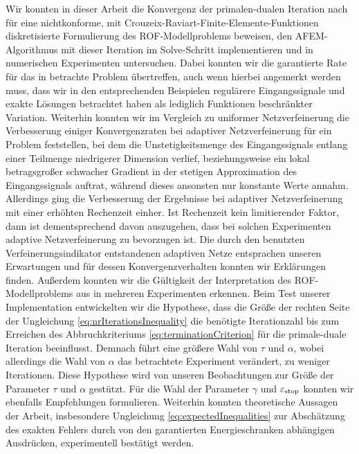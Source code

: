 Wir konnten in dieser Arbeit die Konvergenz der primalen-dualen Iteration nach
\cite{Bar15} für eine nichtkonforme, mit
Crouzeix-Raviart-Finite-Elemente-Funktionen diskretisierte Formulierung des
ROF-Modellproblems beweisen, den AFEM-Algorithmus mit dieser Iteration im
Solve-Schritt implementieren und in numerischen Experimenten
untersuchen. 
Dabei konnten wir die garantierte Rate für das in \cite{Bar15} betrachte
Problem übertreffen, auch wenn hierbei angemerkt werden muss, dass
wir in den entsprechenden Beispielen regulärere Eingangssignale und exakte
Lösungen betrachtet haben als lediglich Funktionen beschränkter Variation.
Weiterhin konnten wir im Vergleich zu uniformer Netzverfeinerung die
Verbesserung einiger Konvergenzraten bei adaptiver Netzverfeinerung für ein
Problem feststellen, bei dem die Unstetigkeitsmenge des Eingangssignals entlang
einer Teilmenge niedrigerer Dimension verlief, beziehungsweise ein
lokal betragsgroßer schwacher Gradient in der stetigen Approximation des
Eingangssignals auftrat, während dieses ansonsten nur konstante Werte annahm.
Allerdings ging die Verbesserung der Ergebnisse bei adaptiver Netzverfeinerung
mit einer erhöhten Rechenzeit einher.
Ist Rechenzeit kein limitierender Faktor, dann ist dementsprechend davon
auszugehen, dass bei solchen Experimenten adaptive Netzverfeinerung zu 
bevorzugen ist.
Die durch den benutzten Verfeinerungsindikator entstandenen adaptiven Netze
entsprachen unseren Erwartungen und für dessen Konvergenzverhalten konnten
wir Erklärungen finden.
Außerdem konnten wir die Gültigkeit der Interpretation des ROF-Modellproblems
aus  in mehreren Experimenten erkennen.
Beim Test unserer Implementation entwickelten wir die Hypothese, dass die Größe
der rechten Seite der Ungleichung \eqref{eq:nrIterationsInequality} die
benötigte Iterationzahl bis zum Erreichen des Abbruchkriteriums
\eqref{eq:terminationCriterion} für die primale-duale Iteration beeinflusst.
Demnach führt eine größere Wahl von $\tau$ und $\alpha$, wobei allerdings die
Wahl von $\alpha$ das betrachtete Experiment verändert, zu weniger Iterationen.
Diese Hypothese wird von unseren Beobachtungen zur Größe der Parameter $\tau$
und $\alpha$ gestützt.
Für die Wahl der Parameter $\gamma$ und $\varepsilon_{\textup{stop}}$ konnten wir ebenfalls
Empfehlungen formulieren.
Weiterhin konnten theoretische Aussagen der Arbeit, insbesondere Ungleichung
\eqref{eq:expectedInequalities} zur Abschätzung des exakten Fehlers durch von
den garantierten Energieschranken abhängigen Ausdrücken, experimentell
bestätigt werden.

